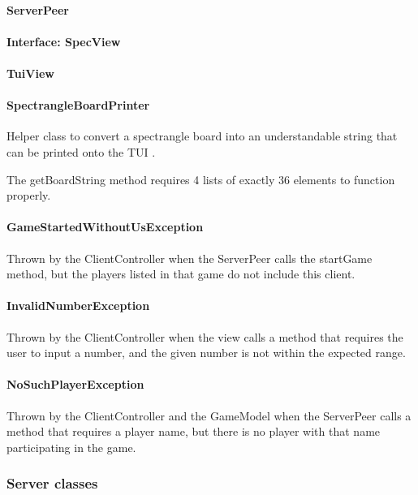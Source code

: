 \documentclass[12pt, letterpaper]{article}
\begin{document}
    \paragraph{ServerPeer}

    \paragraph{Interface: SpecView}

    \paragraph{TuiView}

    \paragraph{SpectrangleBoardPrinter}
    Helper class to convert a spectrangle board into an understandable string that can be printed onto the TUI .

    The getBoardString method requires 4 lists of exactly 36 elements to function properly.

    \paragraph{GameStartedWithoutUsException}
    Thrown by the ClientController when the ServerPeer calls the startGame method, but the
    players listed in that game do not include this client.

    \paragraph{InvalidNumberException}
    Thrown by the ClientController when the view calls a method that requires the user to input a number, and
    the given number is not within the expected range.

    \paragraph{NoSuchPlayerException}
    Thrown by the ClientController and the GameModel when the ServerPeer calls a method that requires a player name,
    but there is no player with that name participating in the game.



    \subsubsection{Server classes}
\end{document}

